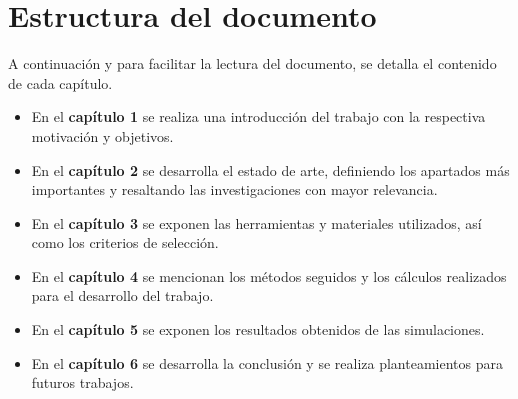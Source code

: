\section{Estructura del documento}

A continuación y para facilitar la lectura del documento, se detalla el contenido de cada capítulo.

\begin{itemize}
\item En el \textbf{capítulo 1} se realiza una introducción del trabajo con la respectiva motivación y objetivos.
\item En el \textbf{capítulo 2} se desarrolla el estado de arte, definiendo los apartados más importantes y resaltando las investigaciones con mayor relevancia.
\item En el \textbf{capítulo 3} se exponen las herramientas y materiales utilizados, así como los criterios de selección.
\item En el \textbf{capítulo 4} se mencionan los métodos seguidos y los cálculos realizados para el desarrollo del trabajo.
\item En el \textbf{capítulo 5} se exponen los resultados obtenidos de las simulaciones.
\item En el \textbf{capítulo 6} se desarrolla la conclusión y se realiza planteamientos para futuros trabajos.
\end{itemize}
